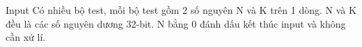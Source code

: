 Input
Có nhiều bộ test, mỗi bộ test gồm 2 số nguyên N và K trên 1 dòng. N và K đều là các số nguyên dương 32-bit. N bằng 0 đánh dấu kết thúc input và không cần xử lí.
